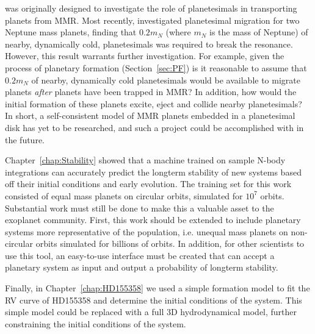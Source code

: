 \hermes was originally designed to investigate the role of planetesimals in transporting planets from MMR. 
Most recently, \citet{Chatterjee2015} investigated planetesimal migration for two Neptune mass planets, finding that $0.2m_N$ (where $m_N$ is the mass of Neptune) of nearby, dynamically cold, planetesimals was required to break the resonance. 
However, this result warrants further investigation. 
For example, given the process of planetary formation (Section~\ref{sec:PF}) is it reasonable to assume that $0.2m_N$ of nearby, dynamically cold planetesimals would be available to migrate planets \textit{after} planets have been trapped in MMR?
In addition, how would the initial formation of these planets excite, eject and collide nearby planetesimals?
In short, a self-consistent model of MMR planets embedded in a planetesimal disk has yet to be researched, and such a project could be accomplished with \hermes in the future.

Chapter~\ref{chap:Stability} showed that a machine trained on sample N-body integrations can accurately predict the longterm stability of new systems based off their initial conditions and early evolution. 
The training set for this work consisted of equal mass planets on circular orbits, simulated for $10^7$ orbits. 
Substantial work must still be done to make this a valuable asset to the exoplanet community.
First, this work should be extended to include planetary systems more representative of the \kep population, i.e. unequal mass planets on non-circular orbits simulated for billions of orbits. 
In addition, for other scientists to use this tool, an easy-to-use interface must be created that can accept a planetary system as input and output a probability of longterm stability. 

Finally, in Chapter~\ref{chap:HD155358} we used a simple formation model to fit the RV curve of HD155358 and determine the initial conditions of the system. 
This simple model could be replaced with a full 3D hydrodynamical model, further constraining the initial conditions of the system. 


